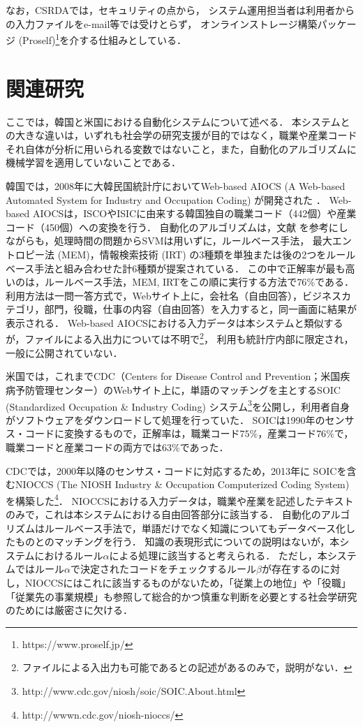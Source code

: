 \documentclass[japanese]{jnlp_1.4}
\begin{document}
なお，CSRDAでは，セキュリティの点から， システム運用担当者は利用者からの入力ファイルをe-mail等では受けとらず， オンラインストレージ構築パッケージ (Proself)\footnote{https://www.proself.jp/}を介する仕組みとしている．


\section{関連研究}
\label{sec:kanren}

ここでは，韓国と米国における自動化システムについて述べる．
本システムとの大きな違いは，いずれも社会学の研究支援が目的ではなく，職業や産業コードそれ自体が分析に用いられる変数ではないこと，また，自動化のアルゴリズムに機械学習を適用していないことである．

韓国では，2008年に大韓民国統計庁においてWeb-based AIOCS (A Web-based Automated System for Industry and Occupation Coding) が開発された \cite{Jung_et_al08}．
Web-based AIOCSは，ISCOやISICに由来する韓国独自の職業コード（442個）や産業コード（450個）への変換を行う．
自動化のアルゴリズムは，文献 \cite{Takahashi00,Takahashi_et_al05a}を参考にしながらも，処理時間の問題からSVMは用いずに，ルールベース手法， 最大エントロピー法 (MEM)，情報検索技術 (IRT) の3種類を単独または後の2つをルールベース手法と組み合わせた計6種類が提案されている．
この中で正解率が最も高いのは，ルールベース手法，MEM, IRTをこの順に実行する方法で$76\%$である．
利用方法は一問一答方式で，Webサイト上に，会社名（自由回答），ビジネスカテゴリ，部門，役職，仕事の内容（自由回答）を入力すると，同一画面に結果が表示される．
Web-based AIOCSにおける入力データは本システムと類似するが，ファイルによる入出力については不明で\footnote{ファイルによる入出力も可能であるとの記述があるのみで，説明がない．}，
利用も統計庁内部に限定され，一般に公開されていない．

米国では，これまでCDC（Centers for Disease Control and Prevention；米国疾病予防管理センター）のWebサイト上に，単語のマッチングを主とするSOIC (Standardized Occupation \& Industry Coding) システム\footnote{http://www.cdc.gov/niosh/soic/SOIC.About.html}を公開し，利用者自身がソフトウェアをダウンロードして処理を行っていた．
SOICは1990年のセンサス・コードに変換するもので，正解率は，職業コード$75\%$，産業コード$76\%$で，職業コードと産業コードの両方では$63\%$であった．

CDCでは，2000年以降のセンサス・コードに対応するため，2013年に
SOICを含むNIOCCS (The NIOSH Industry \& Occupation Computerized Coding System) を構築した\footnote{http://wwwn.cdc.gov/niosh-nioccs/}．  
NIOCCSにおける入力データは，職業や産業を記述したテキストのみで，これは本システムにおける自由回答部分に該当する．
自動化のアルゴリズムはルールベース手法で，単語だけでなく知識についてもデータベース化したものとのマッチングを行う．
知識の表現形式についての説明はないが，本システムにおけるルール$\alpha$による処理に該当すると考えられる．
ただし，本システムではルール$\alpha$で決定されたコードをチェックするルール$\beta$が存在するのに対し，NIOCCSにはこれに該当するものがないため，「従業上の地位」や「役職」「従業先の事業規模」も参照して総合的かつ慎重な判断を必要とする社会学研究のためには厳密さに欠ける．
\end{document}
